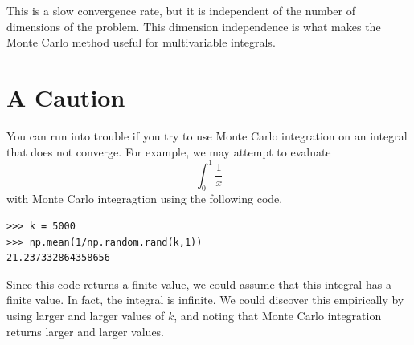 This is a slow convergence rate, but it is independent of the number of dimensions of the problem. 
This dimension independence is what makes the Monte Carlo method useful for multivariable integrals.

\section*{A Caution}
You can run into trouble if you try to use Monte Carlo integration on an integral that does not converge.
For example, we may attempt to evaluate
\[
\int_0^1 \frac{1}{x}
\]
with Monte Carlo integragtion using the following code.
\begin{lstlisting}
>>> k = 5000
>>> np.mean(1/np.random.rand(k,1))
21.237332864358656
\end{lstlisting}

Since this code returns a finite value, we could assume that this integral has a finite value.
In fact, the integral is infinite.
We could discover this empirically by using larger and larger values of $k$, and noting that Monte Carlo integration returns larger and larger values.

